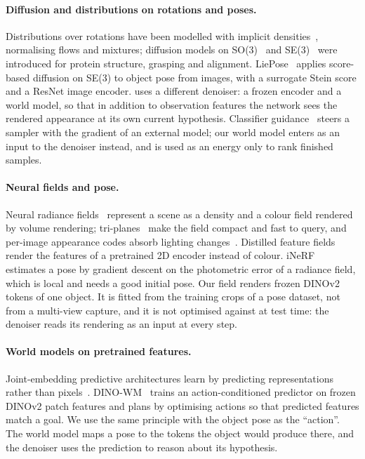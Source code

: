\paragraph{Diffusion and distributions on rotations and poses.}
Distributions over rotations have been modelled with implicit densities~\cite{murphy2021ipdf}, normalising flows and
mixtures; diffusion models on SO(3)~\cite{leach2022so3diffusion} and SE(3)~\cite{yim2023se3diffusion,urain2023se3dif} were
introduced for protein structure, grasping and alignment. LiePose~\cite{hsiao2024liepose} applies score-based diffusion on SE(3) to
object pose from images, with a surrogate Stein score and a ResNet image encoder. \method uses a different denoiser: a frozen
encoder and a world model, so that in addition to observation features the network sees the rendered appearance at its own current
hypothesis.
Classifier guidance~\cite{dhariwal2021diffusion} steers a sampler with the gradient of an external model; our world model enters
as an input to the denoiser instead, and is used as an energy only to rank finished samples.

\paragraph{Neural fields and pose.}
Neural radiance fields~\cite{mildenhall2020nerf} represent a scene as a density and a colour field rendered by volume rendering;
tri-planes~\cite{chan2022eg3d} make the field compact and fast to query, and per-image appearance codes absorb lighting
changes~\cite{martinbrualla2021nerfw}. Distilled feature fields~\cite{kobayashi2022dff} render the features of a pretrained 2D encoder
instead of colour. iNeRF~\cite{yen2021inerf} estimates a pose by gradient descent on the photometric error of a radiance field, which is
local and needs a good initial pose. Our field renders frozen DINOv2 tokens of one object. It is fitted from the training crops of a pose
dataset, not from a multi-view capture, and it is not optimised against at test time: the denoiser reads its rendering as an input
at every step.

\paragraph{World models on pretrained features.}
Joint-embedding predictive architectures learn by predicting representations rather than pixels~\cite{assran2023ijepa,bardes2024vjepa}.
DINO-WM~\cite{zhou2025dinowm} trains an action-conditioned predictor on frozen DINOv2 patch features and plans by optimising actions
so that predicted features match a goal. We use the same principle with the object pose as the ``action''. The world model maps a
pose to the tokens the object would produce there, and the denoiser uses the prediction to reason about its hypothesis.

